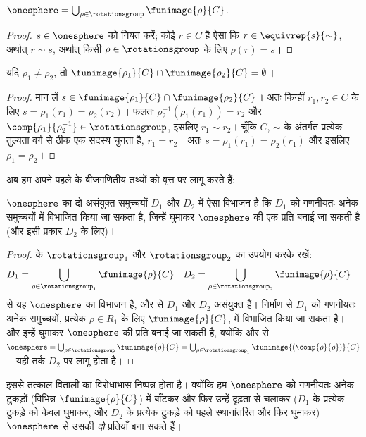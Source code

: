 \documentclass[../../../include/open-logic-section]{subfiles}
\begin{document}
\begin{lem}
$\onesphere = \bigcup_{\rho \in \rotationsgroup} \funimage{\rho}{C}$.
\end{lem}

\begin{proof}
$s\in\onesphere$ को नियत करें; कोई $r\in C$ है ऐसा कि
$r\in\equivrep{s}{\sim}$, अर्थात् $r\sim s$, अर्थात् किसी
$\rho\in\rotationsgroup$ के लिए $\rho(r)=s$।
\end{proof}

\begin{lem}
यदि $\rho_1\neq\rho_2$, तो
$\funimage{\rho_1}{C}\cap\funimage{\rho_2}{C}=\emptyset$।
\end{lem}

\begin{proof}
मान लें $s\in\funimage{\rho_1}{C}\cap\funimage{\rho_2}{C}$। अतः किन्हीं
$r_1,r_2\in C$ के लिए $s=\rho_1(r_1)=\rho_2(r_2)$। फलतः
$\rho^{-1}_2(\rho_1(r_1))=r_2$ और
$\comp{\rho_1}{\rho^{-1}_2}\in\rotationsgroup$, इसलिए $r_1\sim r_2$।
चूँकि $C$, $\sim$ के अंतर्गत प्रत्येक तुल्यता वर्ग से ठीक एक सदस्य चुनता
है, $r_1=r_2$। अतः $s=\rho_1(r_1)=\rho_2(r_1)$ और इसलिए
$\rho_1=\rho_2$।
\end{proof}

अब हम अपने पहले के बीजगणितीय तथ्यों को वृत्त पर लागू करते हैं:

\begin{lem}
$\onesphere$ का दो असंयुक्त समुच्चयों $D_1$ और $D_2$ में ऐसा विभाजन है कि
$D_1$ को गणनीयतः अनेक समुच्चयों में विभाजित किया जा सकता है, जिन्हें
घुमाकर $\onesphere$ की एक प्रति बनाई जा सकती है (और इसी प्रकार $D_2$ के
लिए)।
\end{lem}

\begin{proof}
 के $\rotationsgroup_1$ और $\rotationsgroup_2$ का
उपयोग करके रखें:
\begin{align*}
	D_{1} &= \bigcup_{\rho \in \rotationsgroup_1} \funimage{\rho}{C} & 
	D_{2} &= \bigcup_{\rho \in \rotationsgroup_2} \funimage{\rho}{C}
\end{align*}
 से यह $\onesphere$ का विभाजन है, और
 से $D_1$ और $D_2$ असंयुक्त हैं। निर्माण से $D_1$
को गणनीयतः अनेक समुच्चयों, प्रत्येक $\rho\in R_1$ के लिए
$\funimage{\rho}{C}$, में विभाजित किया जा सकता है। और इन्हें घुमाकर
$\onesphere$ की प्रति बनाई जा सकती है, क्योंकि  और
 से $\onesphere=\bigcup_{\rho\in
\rotationsgroup}\funimage{\rho}{C}=\bigcup_{\rho\in
\rotationsgroup_1}\funimage{(\comp{\rho}{\rho})}{C}$। यही तर्क $D_2$ पर
लागू होता है। \end{proof}\noindent इससे तत्काल विताली का विरोधाभास
निष्पन्न होता है। क्योंकि हम $\onesphere$ को गणनीयतः अनेक टुकड़ों (विभिन्न
$\funimage{\rho}{C}$) में बाँटकर और फिर उन्हें दृढ़ता से चलाकर ($D_1$ के
प्रत्येक टुकड़े को केवल घुमाकर, और $D_2$ के प्रत्येक टुकड़े को पहले
स्थानांतरित और फिर घुमाकर) $\onesphere$ से उसकी \emph{दो} प्रतियाँ बना सकते
हैं।
\end{document}
